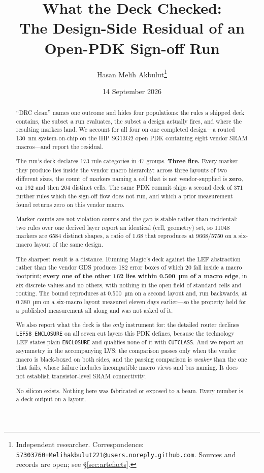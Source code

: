 \documentclass[11pt,a4paper]{article}
\title{What the Deck Checked:\\
The Design-Side Residual of an Open-PDK Sign-off Run}
\author{Hasan Melih Akbulut\thanks{Independent researcher.
Correspondence: \texttt{57303760+Melihakbulut221@users.noreply.github.com}.
Sources and records are open; see \S\ref{sec:artefacts}.}}
\date{14 September 2026}
\begin{document}
\maketitle

\begin{abstract}
``DRC clean'' names one outcome and hides four populations: the rules a
shipped deck contains, the subset a run evaluates, the subset a design
actually fires, and where the resulting markers land. We account for all
four on one completed design---a routed \SI{130}{\nano\meter}
system-on-chip on the IHP SG13G2 open PDK containing eight vendor SRAM
macros---and report the residual.

The run's deck declares \num{173} rule categories in 47 groups. \textbf{Three
fire.} Every marker they produce lies inside the vendor macro hierarchy:
across three layouts of two different sizes, the count of markers naming
a cell that is not vendor-supplied is \textbf{zero}, on \num{192} and then
\num{204} distinct cells. The same PDK commit ships a second deck of
\num{371} further rules which the sign-off flow does not run, and which a
prior measurement found returns zero on this vendor macro.

Marker counts are not violation counts and the gap is stable rather than
incidental: two rules over one derived layer report an identical
(cell, geometry) set, so \num{11048} markers are \num{6584} distinct
shapes, a ratio of \num{1.68} that reproduces at \num{9668}/\num{5750}
on a six-macro layout of the same design.

The sharpest result is a distance. Running Magic's deck against the
LEF abstraction rather than the vendor GDS produces \num{182} error boxes
of which \num{20} fall inside a macro footprint; \textbf{every one of the
other \num{162} lies within \SI{0.500}{\um} of a macro edge}, in
six discrete values and no others, with nothing in the open field of
standard cells and routing. The bound reproduces at
\SI{0.500}{\um} on a second layout and, run backwards, at
\SI{0.380}{\um} on a six-macro layout measured eleven days
earlier---so the property held for a published measurement all along and
was not asked of it.

We also report what the deck is the \emph{only} instrument for: the
detailed router declines \texttt{LEF58\_ENCLOSURE} on all seven cut
layers this PDK defines, because the technology LEF states plain
\texttt{ENCLOSURE} and qualifies none of it with \texttt{CUTCLASS}. And
we report an asymmetry in the accompanying LVS: the comparison passes
only when the vendor macro is black-boxed on both sides, and the passing
comparison is \emph{weaker} than the one that fails, whose failure includes incompatible macro views and bus naming. It does
not establish transistor-level SRAM connectivity.

No silicon exists. Nothing here was fabricated or exposed to a beam.
Every number is a deck output on a layout.
\end{abstract}
\end{document}
